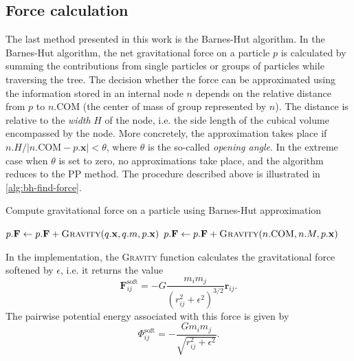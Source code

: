 \subsection{Force calculation}
The last method presented in this work is the Barnes-Hut algorithm.
In the Barnes-Hut algorithm, the net gravitational force on a particle $p$ is calculated by summing the contributions from single particles or groups of particles while traversing the tree.
The decision whether the force can be approximated using the information stored in an internal node $n$ depends on the relative distance from $p$ to $n.\textrm{COM}$ (the center of mass of group represented by $n$).
The distance is relative to the \textit{width} $H$ of the node, i.e. the side length of the cubical volume encompassed by the node.
More concretely, the approximation takes place if $n.H / |n.\mathrm{COM} - p.\mathbf{x}| < \theta$, where $\theta$ is the so-called \textit{opening angle}.
In the extreme case when $\theta$ is set to zero, no approximations take place, and the algorithm reduces to the PP method.
The procedure described above is illustrated in \autoref{alg:bh-find-force}.
\begin{algorithm}
    \caption{Compute gravitational force on a particle using Barnes-Hut approximation}
    \label{alg:bh-find-force}
    \begin{algorithmic}[1]
        \State $p.\mathbf{F} \gets p.\mathbf{F} + \Call{Gravity}{q.\mathbf{x}, q.m, p.\mathbf{x}}$
        \EndIf
        \State \Return
        \EndIf
        \State $p.\mathbf{F} \gets p.\mathbf{F} + \Call{Gravity}{n.\mathrm{COM}, n.M, p.\mathbf{x}}$
        \State \Return
        \EndIf
        \State {}
        \EndFor
        \EndFunction
    \end{algorithmic}
\end{algorithm}
In the implementation, the \textsc{Gravity} function calculates the gravitational force softened by $\epsilon$, i.e. it returns the value
\begin{equation*}
    \mathbf{F}^\textrm{soft}_{ij} = -G\frac{m_i m_j}{(r_{ij}^2 + \epsilon^2)^{3/2}}\mathbf{r}_{ij}.
\end{equation*}
The pairwise potential energy associated with this force is given by
\begin{equation}\label{eq:pe-soft}
    \Phi_{ij}^\textrm{soft} = - \frac{G m_i m_j}{\sqrt{r_{ij}^2 + \epsilon^2}}.
\end{equation}

